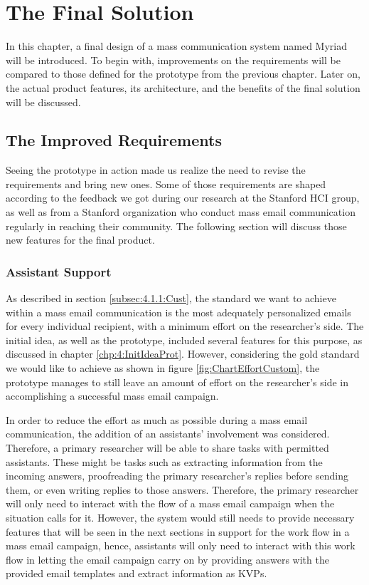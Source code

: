\chapter{The Final Solution}
\label{chp:5:FinaSolu}
In this chapter, a final design of a mass communication system named Myriad will be introduced. To begin with, improvements on the requirements will be compared to those defined for the prototype from the previous chapter. Later on, the actual product features, its architecture, and the benefits of the final solution will be discussed.

\section{The Improved Requirements}
\label{sec:5.1:ImprRequ}

Seeing the prototype in action made us realize the need to revise the requirements and bring new ones. Some of those requirements are shaped according to the feedback we got during our research at the Stanford \ac{HCI} group, as well as from a Stanford organization who conduct mass email communication regularly in reaching their community. The following section will discuss those new features for the final product.

\subsection{Assistant Support}
\label{subsec:5.1.1:AssiSupp}
As described in section \ref{subsec:4.1.1:Cust}, the standard we want to achieve within a mass email communication is the most adequately personalized emails for every individual recipient, with a minimum effort on the researcher's side. The initial idea, as well as the prototype, included several features for this purpose, as discussed in chapter \ref{chp:4:InitIdeaProt}. However, considering the gold standard we would like to achieve as shown in figure \ref{fig:ChartEffortCustom}, the prototype manages to still leave an amount of effort on the researcher's side in accomplishing a successful mass email campaign.
\vspace{1cm}

In order to reduce the effort as much as possible during a mass email communication, the addition of an assistants' involvement was considered. Therefore, a primary researcher will be able to share tasks with permitted assistants. These might be tasks such as extracting information from the incoming answers, proofreading the primary researcher's replies before sending them, or even writing replies to those answers. Therefore, the primary researcher will only need to interact with the flow of a mass email campaign when the situation calls for it. However, the system would still needs to provide necessary features that will be seen in the next sections in support for the work flow in a mass email campaign, hence, assistants will only need to interact with this work flow in letting the email campaign carry on by providing answers with the provided email templates and extract information as \ac{KVP}s.

